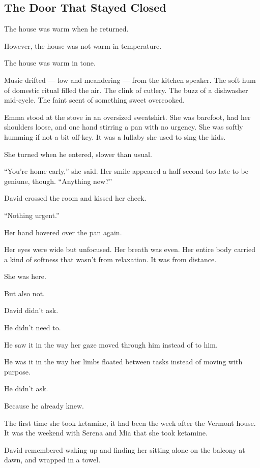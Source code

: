 
\subsection{The Door That Stayed Closed}

The house was warm when he returned.

However, the house was not warm in temperature.

The house was warm in tone. 

Music drifted --- low and meandering --- from the kitchen speaker.
The soft hum of domestic ritual filled the air.
The clink of cutlery. 
The buzz of a 
dishwasher mid-cycle. 
The faint scent of something sweet overcooked. 

Emma stood at the stove in an oversized sweatshirt. 
She was barefoot, had her shoulders loose, and one hand 
stirring a pan with no urgency. 
She was softly humming if not a bit off-key. It was a lullaby she used to sing the kids.

She turned when he entered, slower than usual.

``You’re home early,'' she said. 
Her smile appeared a half-second too late to be geniune, though. 
``Anything new?''

David crossed the room and kissed her cheek.

``Nothing urgent.''

Her hand hovered over the pan again.

Her eyes were wide but unfocused. 
Her breath was even. 
Her entire body carried a kind of softness that wasn’t from relaxation.
It was from distance. 

She was here.

But also not.

David didn’t ask.

He didn’t need to.

He saw it in the way her gaze moved through him instead of to him. 

He was it in the way her limbs floated between tasks instead of 
moving with purpose.

He didn’t ask.

Because he already knew.

The first time she took ketamine, it had been the week after the Vermont house.
It was the weekend with Serena and Mia that she took ketamine. 

David remembered waking up and finding her sitting alone on the balcony at dawn, 
and wrapped in a towel. 

